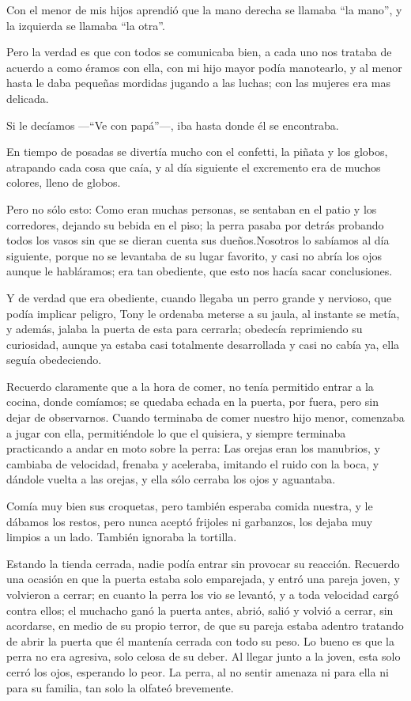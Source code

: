 \documentclass[letterpaper, 12pt]{book}
\begin{document}
Con el menor de mis hijos aprendió que la mano derecha se llamaba ``la mano'', y la izquierda se llamaba ``la otra''. 

Pero la verdad es que con todos se comunicaba bien, a cada uno nos trataba de acuerdo a como éramos con ella, con mi hijo mayor podía manotearlo, y al menor hasta le daba pequeñas mordidas jugando a las luchas; con las mujeres era mas delicada.  

Si le decíamos ---``Ve con papá''---, iba hasta donde él se encontraba.

En tiempo de posadas se divertía mucho con el confetti, la piñata y los globos, atrapando cada cosa que caía, y al día siguiente el excremento era de muchos colores, lleno de globos. 

Pero no sólo esto: Como eran muchas personas, se sentaban en el patio y los corredores, dejando su bebida en el piso; la perra pasaba por detrás probando todos los vasos sin que se dieran cuenta sus dueños.Nosotros lo sabíamos al día siguiente, porque no se levantaba de su lugar favorito, y casi no abría los ojos aunque le habláramos; era tan obediente, que esto nos hacía sacar conclusiones.

Y de verdad que era obediente, cuando llegaba un perro grande y nervioso, que podía implicar peligro, Tony le ordenaba meterse a su jaula, al instante se metía, y además, jalaba la puerta de esta para cerrarla; obedecía reprimiendo su curiosidad, aunque ya estaba casi totalmente desarrollada y casi no cabía ya, ella seguía obedeciendo.

Recuerdo claramente que a la hora de comer, no tenía permitido entrar a la cocina, donde comíamos; se quedaba echada en la puerta, por fuera, pero sin dejar de observarnos. Cuando terminaba de comer nuestro hijo menor, comenzaba a jugar con ella, permitiéndole lo que el quisiera, y siempre terminaba practicando a andar en moto sobre la perra: Las orejas eran los manubrios, y cambiaba de velocidad, frenaba y aceleraba, imitando el ruido con la boca, y dándole vuelta a las orejas, y ella sólo cerraba los ojos y aguantaba.

Comía muy bien sus croquetas, pero también esperaba comida nuestra, y le dábamos los restos, pero nunca aceptó frijoles ni garbanzos, los dejaba muy limpios a un lado. También ignoraba la tortilla.

Estando la tienda cerrada, nadie podía entrar sin provocar su reacción. Recuerdo una ocasión en que la puerta estaba solo emparejada, y entró una pareja joven, y volvieron a cerrar; en cuanto la perra los vio se levantó, y a toda velocidad cargó contra ellos; el muchacho ganó la puerta antes, abrió, salió y volvió a cerrar, sin acordarse, en medio de su propio terror, de que su pareja estaba adentro tratando de abrir la puerta que él mantenía cerrada con todo su peso. Lo bueno es que la perra no era agresiva, solo celosa de su deber. Al llegar junto a la joven, esta solo cerró los ojos, esperando lo peor. La perra, al no sentir amenaza ni para ella ni para su familia, tan solo la olfateó brevemente.
\end{document}
